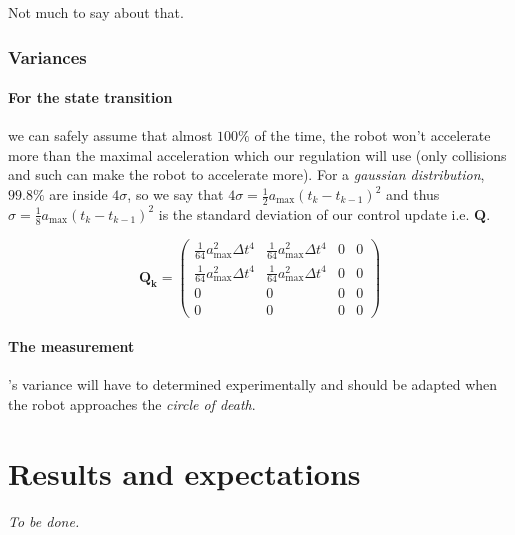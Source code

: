 \documentclass[a4paper, 12pt]{paper}
\begin{document}
Not much to say about that.

\subsubsection{Variances}

\paragraph{For the state transition}
\label{pg:variance_state_trans}
we can safely assume that almost $100\%$ of the time, the robot
won't accelerate more than the maximal acceleration which our regulation will
use (only collisions and such can make the robot to accelerate more).
For a \emph{gaussian distribution}, $99.8\%$ are inside $4\sigma$, so we say
that $4\sigma = \frac{1}{2} a_{\max} {\left( t_k - t_{k-1} \right)}^2 $ and thus 
$\sigma = \frac{1}{8} a_{\max} {\left( t_k - t_{k-1} \right)}^2 $ is the standard
deviation of our control update i.e. $\mathbf{Q}$.

\begin{equation}
    \mathbf{Q_k} = \left( \begin{array}{cccc}
        \frac{1}{64} a_{\max}^2 \Delta t^4 & \frac{1}{64} a_{\max}^2 \Delta t^4 & 0 & 0\\
        \frac{1}{64} a_{\max}^2 \Delta t^4 & \frac{1}{64} a_{\max}^2 \Delta t^4 & 0 & 0\\
        0 & 0 & 0 & 0 \\
        0 & 0 & 0 & 0 \end{array} \right)
\label{eq:q}
\end{equation}

\paragraph{The measurement}'s variance will have to determined experimentally
and should be adapted when the robot approaches the \emph{circle of death}.


\section{Results and expectations}

\emph{To be done.}




\end{document}
